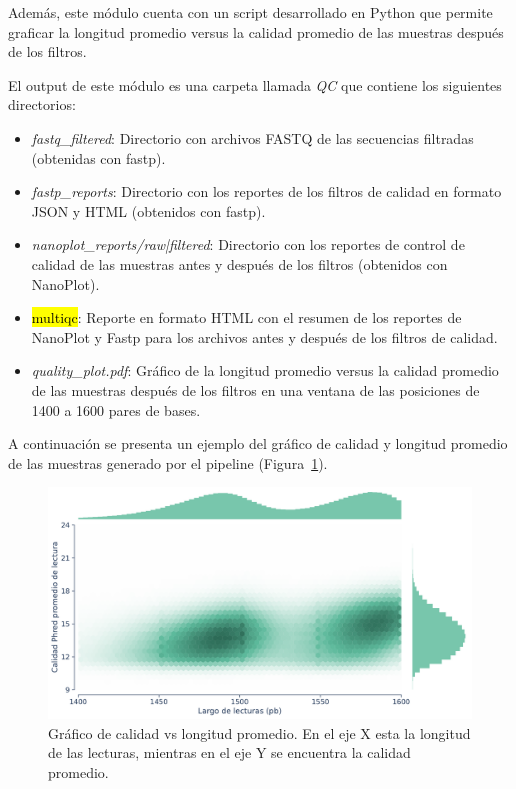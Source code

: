 Además, este módulo cuenta con un script desarrollado en Python que permite graficar la longitud promedio versus la calidad promedio de las muestras después de los filtros.

El output de este módulo es una carpeta llamada \textit{QC} que contiene los siguientes directorios:
\begin{itemize}
    \item \textit{fastq\_filtered}: Directorio con archivos FASTQ de las secuencias filtradas (obtenidas con fastp).
    \item \textit{fastp\_reports}: Directorio con los reportes de los filtros de calidad en formato JSON y HTML (obtenidos con fastp).
    \item \textit{nanoplot\_reports/raw|filtered}: Directorio con los reportes de control de calidad de las muestras antes y después de los filtros (obtenidos con NanoPlot).
    \item \hl{multiqc}: Reporte en formato HTML con el resumen de los reportes de NanoPlot y Fastp para los archivos antes y después de los filtros de calidad.
    \item \textit{quality\_plot.pdf}: Gráfico de la longitud promedio versus la calidad promedio de las muestras después de los filtros en una ventana de las posiciones de 1400 a 1600 pares de bases.
\end{itemize}

A continuación se presenta un ejemplo del gráfico de calidad y longitud promedio de las muestras generado por el pipeline (Figura~\ref{fig:pipeline-quality-plot}).
\begin{figure}[H]
    \centering
    \includegraphics[width=0.85\linewidth]{images/pipeline/quality_plot.pdf}
    \caption{Gráfico de calidad vs longitud promedio. En el eje X esta la longitud de las lecturas, mientras en el eje Y se encuentra la calidad promedio.}
    \label{fig:pipeline-quality-plot}
\end{figure}
